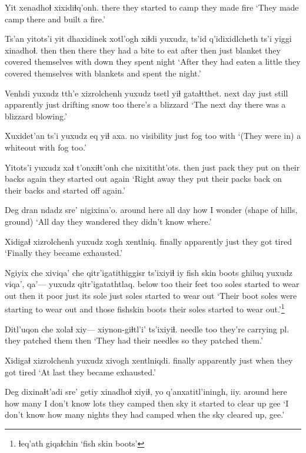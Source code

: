 \documentclass[12pt]{article}
\begin{document}
\gll Yit xenadhoɬ xixidiɬq'onh.
there {they started to camp} {they made fire}
\glt `They made camp there and built a fire.'
\glend

\gll Ts'an yitots'i yit dhaxidinek xotl'ogh xiɬdi yuxudz, ts'id q'idixidlcheth ts'i yiggi xinadhoɬ.
then then there {they had a bite to eat} after then just blanket {they covered themselves with} {} down {they spent night}
\glt `After they had eaten a little they covered themselves with blankets and spent the night.'
\glend

\gll Venhdi yuxudz tth'e xizrolchenh yuxudz tsetl yiɬ gataɬtthet.
{next day} just still apparently just {drifting snow} too {there's a blizzard}
\glt `The next day there was a blizzard blowing.'
\glend

\gll Xuxidet'an ts'i yuxudz eq yiɬ axa.
{no visibility} {} just fog too with
\glt `(They were in) a whiteout with fog too.'
\glend

\gll Yitots'i yuxudz xaɬ t'onxiɬt'onh che nixititht'ots.
then just pack {they put on their backs} again {they started out again}
\glt `Right away they put their packs back on their backs and started off again.'
\glend

\gll Deg dran ndadz sre' nigixina'o.
{around here} {all day} how {I wonder} {(shape of hills, ground)}
\glt `All day they wandered they didn't know where.'
\glend

\gll Xidigaɬ xizrolchenh yuxudz {xogh xentlniq.}
finally apparently just {they got tired}
\glt `Finally they became exhausted.'
\glend

\gll Ngiyix che xiviqa' che qitr'igatithiggisr ts'ixiyiɬ iy {fish skin boots} ghiluq yuxudz viqa', qa'--- yuxudz qitr'igatathtlaq.
below too {their feet} too {soles started to wear out} then it {} poor just {its sole} {} just {soles started to wear out}
\glt `Their boot soles were starting to wear out and those fishskin boots their soles started to wear out.'\footnote{ɬeq'ath giqaɬchin `fish skin boots'}
\glend

\gll Ditl'uqon che xolaɬ xiy--- xiynon-giɬtl'i' ts'ixiyiɬ.
needle too {they're carrying pl.} {} {they patched them} then
\glt `They had their needles so they patched them.'
\glend

\gll Xidigaɬ xizrolchenh yuxudz {xivogh xentlniqdi.}
finally apparently just {when they got tired}
\glt `At last they became exhausted.'
\glend

\gll Deg dixinaɬt'adi sre' getiy xinadhoɬ xiyiɬ, yo q'anxatitl'iningh, iiy.
{around here} {how many} {I don't know} {lots} {they camped} then sky {it started to clear up} gee
\glt `I don't know how many nights they had camped when the sky cleared up, gee.'
\glend
\end{document}
